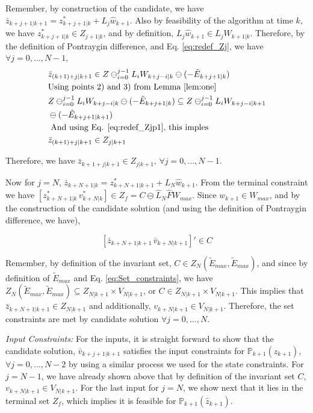 Remember, by construction of the candidate, we have $\bar{z}_{k+j+1|k+1} = z^{*}_{k+j+1|k} + L_j\hat{w}_{k+1}$.
Also by feasibility of the algorithm at time $k$, we have $z^{*}_{k+j+1|k}\in Z_{j+1|k}$, and by definition, $L_j\hat{w}_{k+1} \in L_j{W}_{k+1|k}$. Therefore, by the definition of Pontraygin difference, and Eq. \ref{eq:redef_Zj}, we have $\forall j=0,\dotsc,N-1$,
\begin{subequations}
\begin{align}
&\bar{z}_{(k+1)+j|k+1} \in Z \ominus_{i=0}^{j-1}L_iW_{k+j-i|k} \ominus (-\tilde{E}_{k+j+1|k}) \\
&\text{Using points 2) and 3) from Lemma \ref{lem:one} } \nonumber \\ 
&Z \ominus_{i=0}^{j-1}L_iW_{k+j-i|k} \ominus (-\tilde{E}_{k+j+1|k}) \subseteq Z \ominus_{i=0}^{j-1}L_iW_{k+j-i|k+1}  \nonumber \\
& \ominus (-\tilde{E}_{k+j+1|k+1}) \\
&\text{ And using Eq. \ref{eq:redef_Zjp1}, this imples } \nonumber \\
&\bar{z}_{(k+1)+j|k+1} \in Z_{j|k+1}
\end{align} 
\end{subequations}

Therefore, we have $\bar{z}_{k+1+j|k+1} \in Z_{j|k+1},\,\forall j=0,\dotsc,N-1$. 

Now for $j=N$, $\bar{z}_{k+N+1|k} = z^{*}_{k+N+1|k+1} + L_N\hat{w}_{k+1}$. From the terminal constraint we have $[z^{*}_{k+N+1|k}\, v^{*}_{k+N|k}] \in Z_f = C \ominus \hat{L}_N\hat{F}W_{max}$. Since $w_{k+1} \in W_{max}$, and by the construction of the candidate solution (and using the definition of Pontraygin difference, we have), 

\begin{equation}
\label{eq:CandidateInC}
[\bar{z}_{k+N+1|k+1}\, \bar{v}_{k+N|k+1}]' \in C
\end{equation}

Remember, by definition of the invariant set, $C \in Z_N(\tilde{E}_{max},\tilde{E}_{max})$, and since by definition of $\tilde{E}_{max}$ and Eq. \ref{eq:Set_constraints}, we have $Z_N(\tilde{E}_{max},\tilde{E}_{max}) \subseteq Z_{N|k+1} \times V_{N|k+1}$, or $C \in  Z_{N|k+1} \times {V}_{N|k+1}$. This implies that $\bar{z}_{k+N+1|k+1} \in Z_{N|k+1}$ and additionally, $v_{k+N|k+1} \in {V}_{N|k+1}$.
Therefore, the set constraints are met by candidate solution $\forall j=0,\dotsc,N$. 

\textit{Input Constraints:} For the inputs, it is straight forward to show that the candidate solution, $\bar{v}_{k+j+1|k+1}$ satisfies the input constraints for $\mathbb{P}_{k+1}(\hat{z}_{k+1}) $, $\forall j=0,\dotsc,N-2$ by using a similar process we used for the state constraints. For $j=N-1$, we have already shown above that by definition of the invariant set $C$, $v_{k+N|k+1} \in {V}_{N|k+1}$. For the last input for $j=N$, we show next that it lies in the terminal set $Z_f$, which implies it is feasible for $\mathbb{P}_{k+1}(\hat{z}_{k+1})$.


